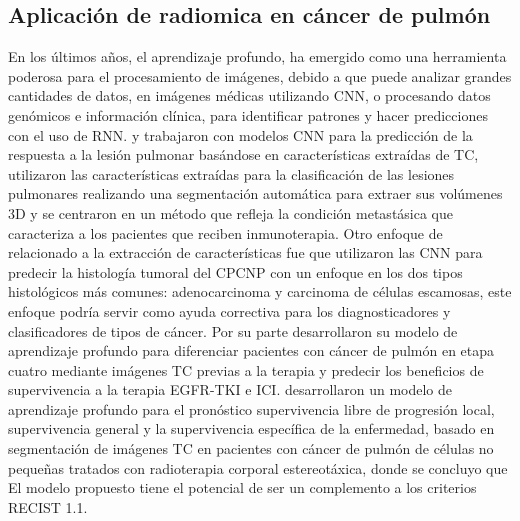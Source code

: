 \documentclass[11pt,a4paper,openany]{article}
\begin{document}
    \subsection{Aplicación de radiomica en cáncer de pulmón}
    En los últimos años, el aprendizaje profundo, ha emergido como una herramienta poderosa para el procesamiento de imágenes, debido a que puede analizar grandes cantidades de datos, en imágenes médicas utilizando CNN, o procesando datos genómicos e información clínica, para identificar patrones y hacer predicciones con el uso de RNN. \cite{Trebeschi2019} y \cite{Chen2020} trabajaron con modelos CNN para la predicción de la respuesta a la lesión pulmonar basándose en características extraídas de TC, \cite{Chen2020} utilizaron las características extraídas para la clasificación de las lesiones pulmonares realizando una segmentación automática para extraer sus volúmenes 3D y \cite{Trebeschi2019} se centraron en un método que  refleja la condición metastásica que caracteriza a los pacientes que reciben inmunoterapia. Otro enfoque de relacionado a la extracción de características fue \cite{Chaunzwa2021} que utilizaron las CNN para predecir la histología tumoral del CPCNP con un enfoque en los dos tipos histológicos más comunes: adenocarcinoma y carcinoma de células escamosas, este enfoque podría servir como ayuda correctiva para los diagnosticadores y clasificadores de tipos de cáncer. Por su parte \cite{Deng2023} desarrollaron su modelo de aprendizaje profundo para diferenciar pacientes con cáncer de pulmón en etapa cuatro mediante imágenes TC previas a la terapia y predecir los beneficios de supervivencia a la terapia EGFR-TKI e ICI. \cite{Gainey2023} desarrollaron un modelo de aprendizaje profundo para el pronóstico supervivencia libre de progresión local, supervivencia general y  la supervivencia específica de la enfermedad, basado en segmentación de imágenes TC en pacientes con cáncer de pulmón de células no pequeñas tratados con radioterapia corporal estereotáxica, donde se concluyo que El modelo propuesto tiene el potencial de ser un complemento a los criterios RECIST 1.1.\\
    
\end{document}
